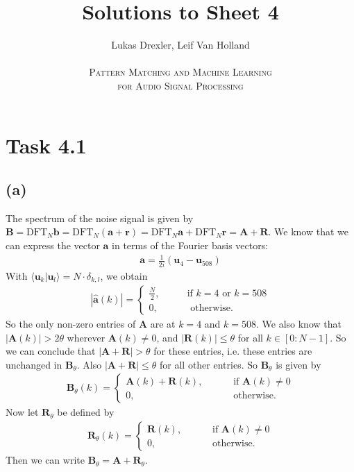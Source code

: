 \documentclass[12pt]{article}
\begin{document}
\title{Solutions to Sheet 4}
\author{Lukas Drexler, Leif Van Holland \\ \\
\textsc{Pattern Matching and Machine Learning} \\
\textsc{for Audio Signal Processing}}
\maketitle

\section*{Task 4.1}
\subsection*{(a)}
The spectrum of the noise signal is given by $\mathbf{B} = \text{DFT}_{N}\mathbf{b} = \text{DFT}_{N}(\mathbf{a} + \mathbf{r})
= \text{DFT}_{N}\mathbf{a} + \text{DFT}_{N}\mathbf{r} = \mathbf{A} + \mathbf{R}$.
We know that we can express the vector $\mathbf{a}$ in terms of the Fourier basis vectors:
\begin{align*}
\mathbf{a} = \frac{1}{2i}(\mathbf{u}_{4} - \mathbf{u}_{508})
\end{align*} 
With $\langle\mathbf{u}_{k}|\mathbf{u}_{l}\rangle = N\cdot\delta_{k,l}$, we obtain
\begin{align*}
|\hat{\mathbf{a}}(k)| = \begin{cases}
\frac{N}{2},\qquad&\text{if }k=4 \text{ or } k=508\\
0,\qquad&\text{ otherwise.}
\end{cases}
\end{align*}
So the only non-zero entries of $\mathbf{A}$ are at $k=4$ and $k=508$.  We also know that $|\mathbf{A}(k)| > 2\theta$ wherever $\mathbf{A}(k)\neq 0$, and $|\mathbf{R}(k)|\leq \theta$ for all $k \in [0:N-1]$. So we can conclude that $|\mathbf{A}+\mathbf{R}|>\theta$ for these entries, i.e. these entries are unchanged in $\mathbf{B}_{\theta}$. Also $|\mathbf{A}+\mathbf{R}|\leq \theta $ for all other entries. So $\mathbf{B}_{\theta}$ is given by
\begin{align*}
\mathbf{B}_{\theta}(k) = \begin{cases}
\mathbf{A}(k) + \mathbf{R}(k),\qquad&\text{ if }\mathbf{A}(k)\neq 0\\
0,\qquad&\text{ otherwise}.
\end{cases}
\end{align*}
Now let $\mathbf{R}_{\theta}$ be defined by
\begin{align*}
\mathbf{R}_{\theta}(k) = \begin{cases}
\mathbf{R}(k),\qquad&\text{ if }\mathbf{A}(k)\neq 0\\
0,\qquad&\text{ otherwise}.
\end{cases}
\end{align*}
Then we can write $\mathbf{B}_{\theta} = \mathbf{A} + \mathbf{R}_{\theta}$.
\end{document}
